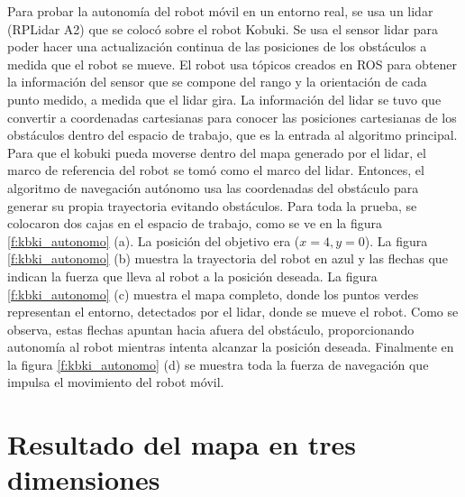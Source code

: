 Para probar la autonomía del robot móvil en un entorno real, se usa un lidar (RPLidar A2) 
que se colocó sobre el robot Kobuki. Se usa el sensor lidar para poder hacer una actualización 
continua de las posiciones de los obstáculos a medida que el robot se mueve. El robot usa tópicos 
creados en ROS para obtener la información del sensor que se compone del rango y la orientación de 
cada punto medido, a medida que el lidar gira. La información del lidar se tuvo que convertir a 
coordenadas cartesianas para conocer las posiciones cartesianas de los obstáculos dentro del espacio 
de trabajo, que es la entrada al algoritmo principal. Para que el kobuki pueda moverse dentro 
del mapa generado por el lidar, el marco de referencia del robot se tomó como el marco del 
lidar. Entonces, el algoritmo de navegación autónomo usa las coordenadas del 
obstáculo para generar su propia trayectoria evitando obstáculos. Para toda la prueba, se 
colocaron dos cajas en el espacio de trabajo, como se ve en la figura \ref{f:kbki_autonomo} 
(a). La posición del objetivo era ($x = 4, y = 0$). La figura \ref{f:kbki_autonomo} (b) muestra 
la trayectoria del robot en azul y las flechas que indican la fuerza que lleva al robot a la 
posición deseada. La figura \ref{f:kbki_autonomo} (c) muestra el mapa completo, donde los puntos 
verdes representan el entorno, detectados por el lidar, donde se mueve el robot. Como se 
observa, estas flechas apuntan hacia afuera del obstáculo, proporcionando autonomía al robot 
mientras intenta alcanzar la posición deseada. Finalmente en la figura \ref{f:kbki_autonomo} (d) se muestra 
toda la fuerza de navegación que impulsa el movimiento del robot móvil.


\section{Resultado del mapa en tres dimensiones}
  

